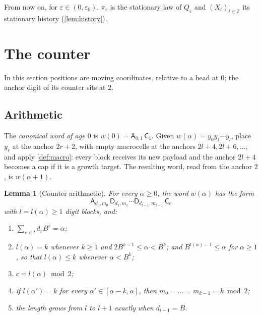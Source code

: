 \documentclass[11pt]{article}
\theoremstyle{plain}
\newtheorem{lemma}[theorem]{Lemma}
\theoremstyle{definition}
\theoremstyle{remark}
\newcommand{\Z}{\mathbb Z}
\newcommand{\eps}{\varepsilon}
\newcommand{\mA}{\mathsf A}
\newcommand{\mD}{\mathsf D}
\newcommand{\mC}{\mathsf C}
\begin{document}
From now on, for $\eps\in(0,\eps_0)$, $\pi_\eps$ is the stationary law of $Q_\eps$ and $(X_t)_{t\in\Z}$ its stationary history (\cref{lem:history}).

\section{The counter}\label{sec:counter}

In this section positions are moving coordinates, relative to a head at $0$; the anchor digit of its counter sits at $2$.

\subsection{Arithmetic}

The \emph{canonical word of age $0$} is $w(0)=\mA_{0,1}\,\mC_1$. Given $w(\alpha)=y_0y_1\cdots y_l$, place $y_r$ at the anchor $2r+2$, with empty macrocells at the anchors $2l+4,2l+6,\dots$, and apply \cref{def:macro}: every block receives its new payload and the anchor $2l+4$ becomes a cap if it is a growth target. The resulting word, read from the anchor $2$, is $w(\alpha+1)$.

\begin{lemma}[Counter arithmetic]\label{lem:arith}
For every $\alpha\ge0$, the word $w(\alpha)$ has the form
\[
\mA_{d_0,m_0}\,\mD_{d_1,m_1}\cdots\mD_{d_{l-1},m_{l-1}}\,\mC_c
\]
with $l=l(\alpha)\ge1$ digit blocks, and:
\begin{enumerate}[label=(\roman*)]
\item $\sum_{r<l}d_rB^r=\alpha$;
\item $l(\alpha)=k$ whenever $k\ge1$ and $2B^{k-1}\le\alpha<B^k$; and $B^{l(\alpha)-1}\le\alpha$ for $\alpha\ge1$, so that $l(\alpha)\le k$ whenever $\alpha<B^k$;
\item $c=l(\alpha)\bmod2$;
\item if $l(\alpha')=k$ for every $\alpha'\in[\alpha-k,\alpha]$, then $m_0=\dots=m_{k-1}=k\bmod2$;
\item the length grows from $l$ to $l+1$ exactly when $d_{l-1}=B$.
\end{enumerate}
\end{lemma}
\end{document}
